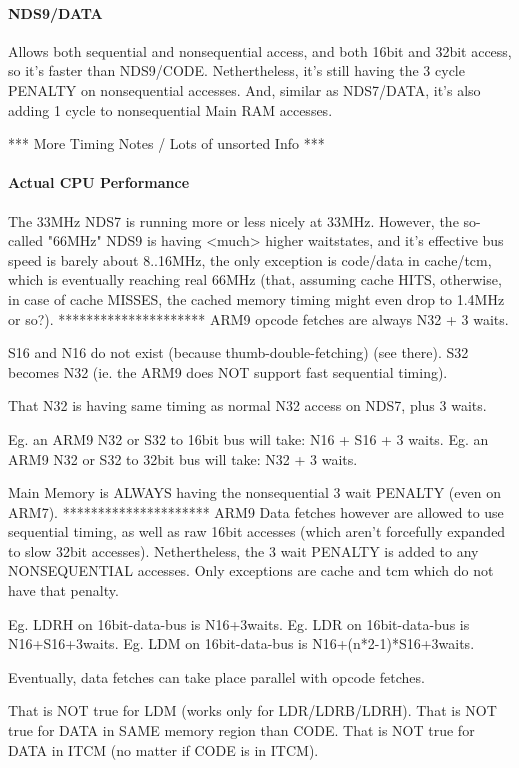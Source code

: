 \documentclass[11pt,a4paper]{proc}
\begin{document}
\begin{flushleft}
\paragraph{NDS9/DATA}
Allows both sequential and nonsequential access, and both 16bit and 32bit access, so it's faster than NDS9/CODE. Nethertheless, it's still having the 3 cycle PENALTY on nonsequential accesses. And, similar as NDS7/DATA, it's also adding 1 cycle to nonsequential Main RAM accesses.

*** More Timing Notes / Lots of unsorted Info ***

\paragraph{Actual CPU Performance}
The 33MHz NDS7 is running more or less nicely at 33MHz. However, the so-called "66MHz" NDS9 is having <much> higher waitstates, and it's effective bus speed is barely about 8..16MHz, the only exception is code/data in cache/tcm, which is eventually reaching real 66MHz (that, assuming cache HITS, otherwise, in case of cache MISSES, the cached memory timing might even drop to 1.4MHz or so?).
*********************
ARM9 opcode fetches are always N32 + 3 waits.

  S16 and N16 do not exist (because thumb-double-fetching) (see there).
  S32 becomes N32 (ie. the ARM9 does NOT support fast sequential timing).

That N32 is having same timing as normal N32 access on NDS7, plus 3 waits.

  Eg. an ARM9 N32 or S32 to 16bit bus will take: N16 + S16 + 3 waits.
  Eg. an ARM9 N32 or S32 to 32bit bus will take: N32 + 3 waits.

Main Memory is ALWAYS having the nonsequential 3 wait PENALTY (even on ARM7).
*********************
ARM9 Data fetches however are allowed to use sequential timing, as well as raw 16bit accesses (which aren't forcefully expanded to slow 32bit accesses).
Nethertheless, the 3 wait PENALTY is added to any NONSEQUENTIAL accesses.
Only exceptions are cache and tcm which do not have that penalty.

 Eg. LDRH on 16bit-data-bus is N16+3waits.
 Eg. LDR  on 16bit-data-bus is N16+S16+3waits.
 Eg. LDM  on 16bit-data-bus is N16+(n*2-1)*S16+3waits.

Eventually, data fetches can take place parallel with opcode fetches.

 That is NOT true for LDM (works only for LDR/LDRB/LDRH).
 That is NOT true for DATA in SAME memory region than CODE.
 That is NOT true for DATA in ITCM (no matter if CODE is in ITCM).


\end{flushleft}
\end{document}
